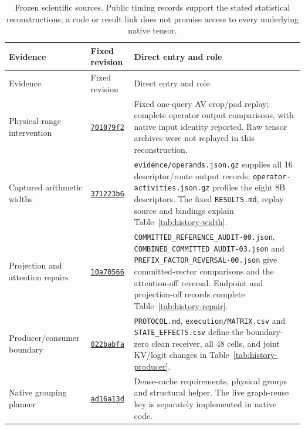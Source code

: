 \small
\begin{longtable}{@{}p{3.2cm}p{2.35cm}p{10.0cm}@{}}
\caption{Frozen scientific sources. Public timing records support the stated statistical reconstructions; a code or result link does not promise access to every underlying native tensor.}\label{tab:supp-source-index}\\
\toprule
Evidence & Fixed revision & Direct entry and role\\\midrule
\endfirsthead
\toprule Evidence & Fixed revision & Direct entry and role\\\midrule\endhead
\bottomrule\endfoot
Physical-range intervention & \href{https://github.com/leecdiang/HeteroSpec/blob/701079f265c0ff8fd05d43fbc2d8d5054a711e1b/platforms/rtx_reference_snapshot/benchmarks/rtx_llama_repair_v1/host_execution/RESULTS.md}{\texttt{701079f2}} & Fixed one-query AV crop/pad replay; complete operator output comparisons, with native input identity reported. Raw tensor archives were not replayed in this reconstruction.\\
Captured arithmetic widths & \href{https://github.com/leecdiang/HeteroSpec/tree/371223b696bb805030c29f04e39eb17b57fb2ebb/benchmarks/rtx_operator_frontier_v1/execution}{\texttt{371223b6}} & \texttt{evidence/operands.json.gz} supplies all 16 descriptor/route output records; \texttt{operator-activities.json.gz} profiles the eight 8B descriptors. The fixed \texttt{RESULTS.md}, replay source and bindings explain Table~\ref{tab:history-width}.\\
Projection and attention repairs & \href{https://github.com/leecdiang/HeteroSpec/tree/10a70566ce01ab707dbdcc57d8270c1434088f07/benchmarks/b570_llama_companion_v1/host_execution}{\texttt{10a70566}} & \nolinkurl{COMMITTED_REFERENCE_AUDIT-00.json}, \nolinkurl{COMBINED_COMMITTED_AUDIT-03.json} and \nolinkurl{PREFIX_FACTOR_REVERSAL-00.json} give committed-vector comparisons and the attention-off reversal. Endpoint and projection-off records complete Table~\ref{tab:history-repair}.\\
Producer/consumer boundary & \href{https://github.com/leecdiang/HeteroSpec/tree/022babfabb3d1b6f4f2a2830dca04b2654d193f9/benchmarks/b570_producer_consumer_boundary_v1}{\texttt{022babfa}} & \texttt{PROTOCOL.md}, \texttt{execution/MATRIX.csv} and \texttt{STATE\_EFFECTS.csv} define the boundary-zero clean receiver, all 48 cells, and joint KV/logit changes in Table~\ref{tab:history-producer}.\\
Native grouping planner & \href{https://github.com/leecdiang/HeteroSpec/blob/ad16a13d2510363bb6f7c7b99241fe9ef1b54bb0/src/reference_batching/reference_batching.hpp}{\texttt{ad16a13d}} & Dense-cache requirements, physical groups and structural helper. The live graph-reuse key is separately implemented in native code.\\

\end{longtable}
